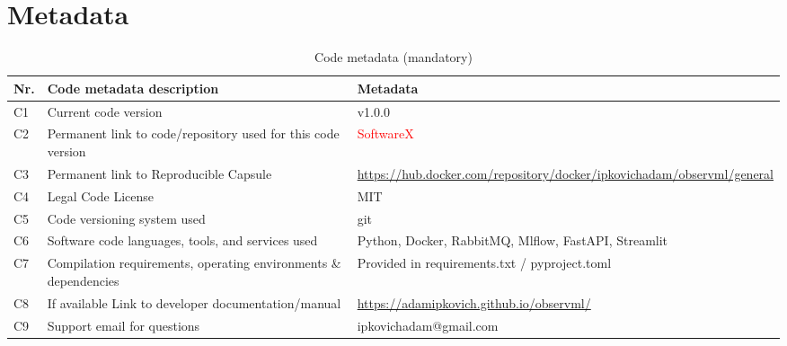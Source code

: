 \documentclass[preprint,12pt, a4paper]{elsarticle}
\begin{document}
\section*{Metadata}
\label{metadata}
\begin{table}[!h]
\begin{tabular}{|l|p{6.5cm}|p{6.5cm}|}
\hline
\textbf{Nr.} & \textbf{Code metadata description} & \textbf{Metadata} \\
\hline
C1 & Current code version & v1.0.0 \\
\hline
C2 & Permanent link to code/repository used for this code version & \textcolor{red}{SoftwareX}  \\
\hline
C3  & Permanent link to Reproducible Capsule & \url{https://hub.docker.com/repository/docker/ipkovichadam/observml/general}\\
\hline
C4 & Legal Code License   & MIT \\
\hline
C5 & Code versioning system used & git \\
\hline
C6 & Software code languages, tools, and services used &  Python, Docker, RabbitMQ, Mlflow, FastAPI, Streamlit   \\
\hline
C7 & Compilation requirements, operating environments \& dependencies & Provided in requirements.txt / pyproject.toml \\
\hline
C8 & If available Link to developer documentation/manual & \url{https://adamipkovich.github.io/observml/} \\
\hline
C9 & Support email for questions &  ipkovichadam@gmail.com\\
\hline
\end{tabular}
\caption{Code metadata (mandatory)}
\label{codeMetadata} 
\end{table}
\end{document}
